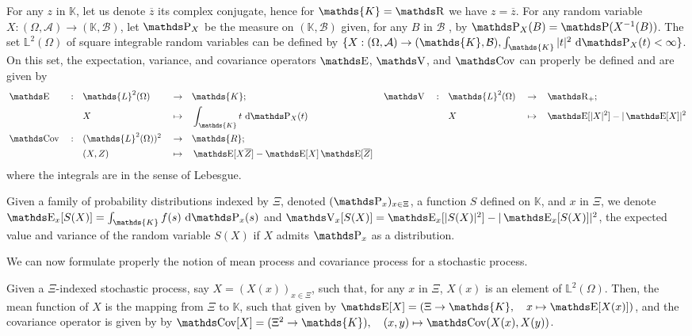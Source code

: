 \begin{de}
For any $z$ in $\mathds{K}$, let us denote $\overline{z}$ its complex conjugate, hence for $\mathds{K} = \R$ we have $z = \overline{z}$.
For any random variable $X : (\Omega, \mathcal{A}) \to (\mathds{K}, \mathcal{B})$, let $\P_{X}$ be the measure on $(\mathds{K}, \mathcal{B})$ given, for any $B$ in $\mathcal{B}$ , by $\P_{X}(B) = \P(X^{-1}(B))$.
The set $\mathds{L}^{2}(\Omega)$ of square integrable random variables can be defined by $\{X : (\Omega, \mathcal{A}) \to (\mathds{K}, \mathcal{B}), \int_{\mathds{K}} \vert t \vert^{2} \d \P_{X}(t) < \infty\}$.
On this set, the expectation, variance, and covariance operators $\E$, $\V$, and $\Cov$ can properly be defined and are given by 
\begin{alignat*}{10}
& \E &&: && \mathds{L}^{2}(\Omega) && \to && \mathds{K}; \quad && \V && : && \mathds{L}^{2}(\Omega) && \to && \R_{+};\\
& && && X && \mapsto && \int_{\mathds{K}} t \d\P_{X}(t) \quad && && && X && \mapsto && \E[\vert X \vert^{2}] - \vert \E[X] \vert^{2} \\
& \Cov && : &&  (\mathds{L}^{2}(\Omega))^{2} && \to && \mathds{R}; && && && && &&\\
& && && (X, Z) && \mapsto && \E[X\overline{Z}] - \E[X] \E[\overline{Z}]&& && && && &&
 \end{alignat*}
where the integrals are in the sense of Lebesgue.
\medskip

Given a family of probability distributions indexed by $\Xi$, denoted $(\P_{x})_{x \in \Xi}$, a function $S$ defined on $\mathds{K}$, and $x$ in $\Xi$, we denote $\E_{x}[S(X)] = \int_{\mathds{K}} f(s) \d \P_{x}(s)$ and $\V_{x}[S(X)] = \E_{x}[\vert S(X) \vert^{2}] - \vert \E_{x}[S(X)] \vert^{2}$, the expected value and variance of the random variable $S(X)$ if $X$ admits $\P_{x}$ as a distribution.
\assEnd
\end{de}

We can now formulate properly the notion of mean process and covariance process for a stochastic process.

\begin{de}
Given a $\Xi$-indexed stochastic process, say $X = (X(x))_{x \in \Xi}$, such that, for any $x$ in $\Xi$, $X(x)$ is an element of $\mathds{L}^{2}(\Omega)$.
Then, the mean function of $X$ is the mapping from $\Xi$ to $\mathds{K}$, such that given by $\E[X] = (\Xi \rightarrow \mathds{K}, \quad x \mapsto \E[X(x)])$, and the covariance operator is given by by $\Cov[X] = (\Xi^{2} \rightarrow \mathds{K}), \quad (x, y) \mapsto \Cov(X(x), X(y))$.
\assEnd
\end{de}

